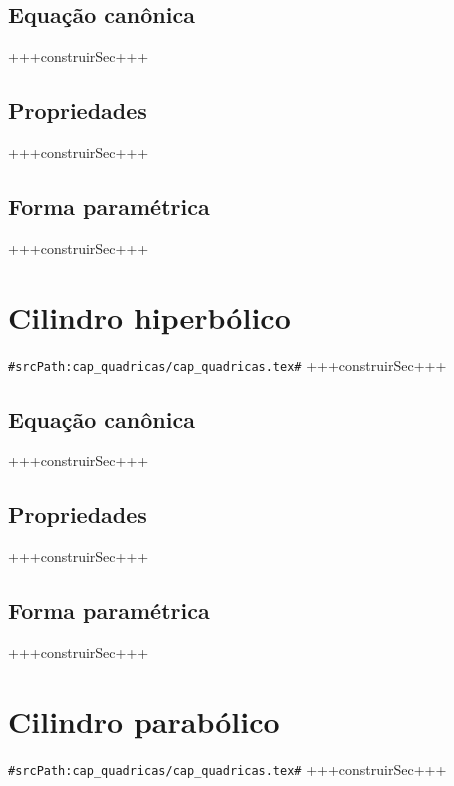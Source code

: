 \subsection{Equação canônica}
+++construirSec+++

\subsection{Propriedades}
+++construirSec+++

\subsection{Forma paramétrica}
+++construirSec+++

\section{Cilindro hiperbólico}
\verb+#srcPath:cap_quadricas/cap_quadricas.tex#+
+++construirSec+++

\subsection{Equação canônica}
+++construirSec+++

\subsection{Propriedades}
+++construirSec+++

\subsection{Forma paramétrica}
+++construirSec+++

\section{Cilindro parabólico}
\verb+#srcPath:cap_quadricas/cap_quadricas.tex#+
+++construirSec+++

